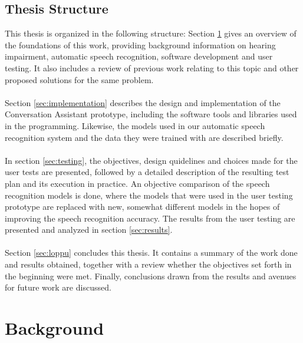 \documentclass[english, 12pt, a4paper, pdftex, elec, utf8]{aaltothesis}
\begin{document}
\subsection{Thesis Structure}

This thesis is organized in the following structure: Section \ref{sec:tausta} gives an overview of the foundations of this work, providing background information on hearing impairment, automatic speech recognition, software development and user testing. It also includes a review of previous work relating to this topic and other proposed solutions for the same problem. \\\\
Section \ref{sec:implementation} describes the design and implementation of the Conversation Assistant prototype, including the software tools and libraries used in the programming. Likewise, the models used in our automatic speech recognition system and the data they were trained with are described briefly. \\\\
In section \ref{sec:testing}, the objectives, design quidelines and choices made for the user tests are presented, followed by a detailed description of the resulting test plan and its execution in practice. An objective comparison of the speech recognition models is done, where the models that were used in the user testing prototype are replaced with new, somewhat different models in the hopes of improving the speech recognition accuracy. The results from the user testing are presented and analyzed in section \ref{sec:results}. \\\\
Section \ref{sec:loppu} concludes this thesis. It contains a summary of the work done and results obtained, together with a review whether the objectives set forth in the beginning were met. Finally, conclusions drawn from the results and avenues for future work are discussed.

\clearpage

\section{Background} \label{sec:tausta}
\end{document}

